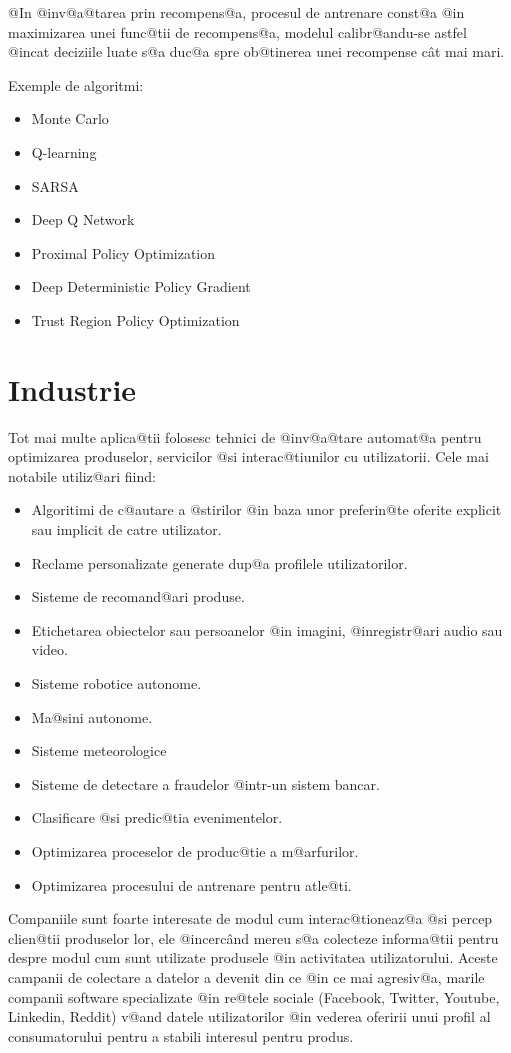 @In @inv@a@tarea prin recompens@a, procesul de antrenare const@a @in maximizarea unei func@tii de recompens@a, modelul calibr@andu-se astfel @incat deciziile luate s@a duc@a spre ob@tinerea unei recompense c\^ at mai mari.

Exemple de algoritmi:
\begin{itemize}
	\item Monte Carlo
	\item Q-learning
	\item SARSA
	\item Deep Q Network
	\item Proximal Policy Optimization
	\item Deep Deterministic Policy Gradient
	\item Trust Region Policy Optimization
\end{itemize}

\section{Industrie}

	Tot mai multe aplica@tii folosesc tehnici de @inv@a@tare automat@a pentru optimizarea produselor, servicilor @si interac@tiunilor cu utilizatorii. Cele mai notabile utiliz@ari fiind:
\begin{itemize}
	\item Algoritimi de c@autare a @stirilor @in baza unor preferin@te oferite explicit sau implicit de catre utilizator.
	\item Reclame personalizate generate dup@a profilele utilizatorilor.
	\item Sisteme de recomand@ari produse.
	\item Etichetarea obiectelor sau persoanelor @in imagini, @inregistr@ari audio sau video.
	\item Sisteme robotice autonome.
	\item Ma@sini autonome.
	\item Sisteme meteorologice
	\item Sisteme de detectare a fraudelor @intr-un sistem bancar.
	\item Clasificare @si predic@tia evenimentelor. 
	\item Optimizarea proceselor de produc@tie a m@arfurilor.
	\item Optimizarea procesului de antrenare pentru atle@ti.
\end{itemize}

	Companiile sunt foarte interesate de modul cum interac@tioneaz@a @si percep clien@tii produselor lor, ele @incerc\^ and mereu s@a colecteze informa@tii pentru despre modul cum sunt utilizate produsele @in activitatea utilizatorului. Aceste campanii de colectare a datelor a devenit din ce @in ce mai agresiv@a, marile companii software specializate @in re@tele sociale (Facebook, Twitter, Youtube, Linkedin, Reddit) v@and datele utilizatorilor @in vederea oferirii unui profil al consumatorului pentru a stabili interesul pentru produs. 
	 
